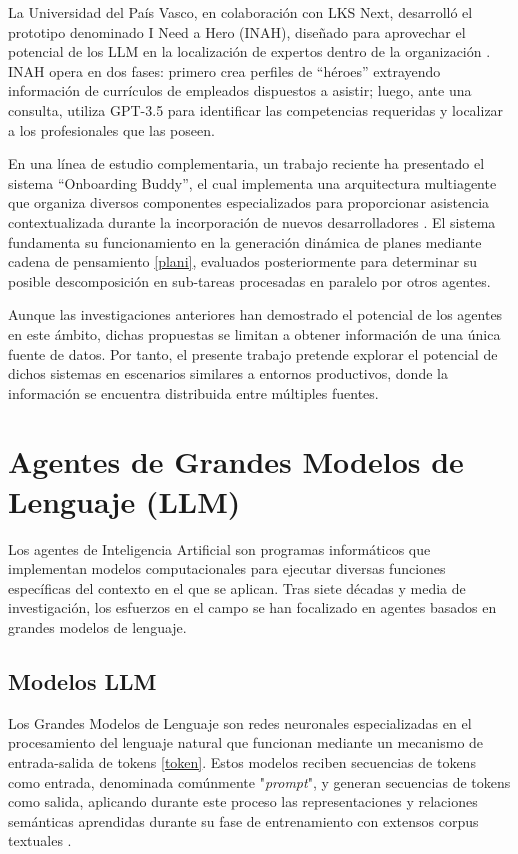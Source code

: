 La Universidad del País Vasco, en colaboración con LKS Next, desarrolló el prototipo denominado I Need a Hero (INAH), diseñado para aprovechar el potencial de los LLM en la localización de expertos dentro de la organización \cite{azanza_can_2024}. INAH opera en dos fases: primero crea perfiles de ``héroes'' extrayendo información de currículos de empleados dispuestos a asistir; luego, ante una consulta, utiliza GPT-3.5 para identificar las competencias requeridas y localizar a los profesionales que las poseen.

En una línea de estudio complementaria, un trabajo reciente ha presentado el sistema ``Onboarding Buddy'', el cual implementa una arquitectura multiagente que organiza diversos componentes especializados para proporcionar asistencia contextualizada durante la incorporación de nuevos desarrolladores \cite{cristian_ionescu_multi-agent_2025}. El sistema fundamenta su funcionamiento en la generación dinámica de planes mediante cadena de pensamiento \ref{plani}, evaluados posteriormente para determinar su posible descomposición en sub-tareas procesadas en paralelo por otros agentes.

Aunque las investigaciones anteriores han demostrado el potencial de los agentes en este ámbito, dichas propuestas se limitan a obtener información de una única fuente de datos. Por tanto, el presente trabajo pretende explorar el potencial de dichos sistemas en escenarios similares a entornos productivos, donde la información se encuentra distribuida entre múltiples fuentes.

\section{Agentes de Grandes Modelos de Lenguaje (LLM)}

Los agentes de Inteligencia Artificial son programas informáticos que implementan modelos computacionales para ejecutar diversas funciones específicas del contexto en el que se aplican. Tras siete décadas y media de investigación, los esfuerzos en el campo se han focalizado en agentes basados en grandes modelos de lenguaje. 

\subsection{Modelos LLM}

Los Grandes Modelos de Lenguaje son redes neuronales especializadas en el procesamiento del lenguaje natural que funcionan mediante un mecanismo de entrada-salida de tokens \ref{token}. Estos modelos reciben secuencias de tokens como entrada, denominada comúnmente "\textit{prompt}", y generan secuencias de tokens como salida, aplicando durante este proceso las representaciones y relaciones semánticas aprendidas durante su fase de entrenamiento con extensos corpus textuales  \cite{vaswani_attention_2017}.

